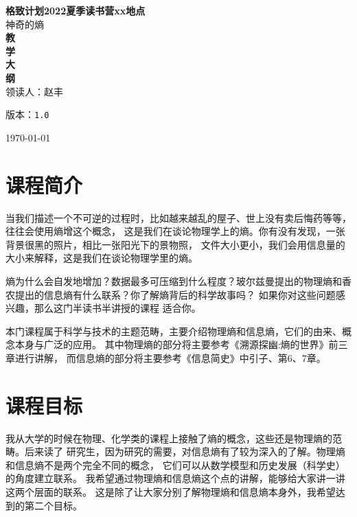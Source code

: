 \documentclass[12pt]{ctexart}
\def\version{1.0}
\newenvironment{smaller}{\zihao{5}}{\zihao{-4}}
\begin{document}
\begin{titlepage}
\begin{center}
    \vspace{-0.5in}
    \textmd{\textbf{\huge{格致计划2022夏季读书营xx地点}}}\\
    \normalsize\vspace{0.1in}\Large{神奇的熵}\\
    \vspace{0.8in}
     \textbf{\huge{教}}\\
    \vspace{0.8in}
     \textbf{\huge{学}}\\
    \vspace{0.8in}
     \textbf{\huge{大}}\\
    \vspace{0.8in}
    \textbf{\huge{纲}}\\
    \vspace{0.8in}
    领读人：赵丰
\vspace{0.2in}
\begin{smaller}

版本：\texttt{\version}

\today
\end{smaller}
\end{center}
\end{titlepage}
\thispagestyle{empty}
\pagebreak
\pagestyle{runningpage}

\section{课程简介}
当我们描述一个不可逆的过程时，比如越来越乱的屋子、世上没有卖后悔药等等，往往会使用熵增这个概念，
这是我们在谈论物理学上的熵。你有没有发现，一张背景很黑的照片，相比一张阳光下的景物照，
文件大小更小，我们会用信息量的大小来解释，这是我们在谈论物理学里的熵。

熵为什么会自发地增加？数据最多可压缩到什么程度？玻尔兹曼提出的物理熵和香农提出的信息熵有什么联系？你了解熵背后的科学故事吗？
如果你对这些问题感兴趣，那么这门半读书半讲授的课程
适合你。

本门课程属于科学与技术的主题范畴，主要介绍物理熵和信息熵，它们的由来、概念本身与广泛的应用。
其中物理熵的部分将主要参考《溯源探幽:熵的世界》前三章进行讲解，
而信息熵的部分将主要参考《信息简史》中引子、第6、7章。


\section{课程目标}
我从大学的时候在物理、化学类的课程上接触了熵的概念，这些还是物理熵的范畴。后来读了
研究生，因为研究的需要，对信息熵有了较为深入的了解。物理熵和信息熵不是两个完全不同的概念，
它们可以从数学模型和历史发展（科学史）的角度建立联系。
我希望通过物理熵和信息熵这个点的讲解，能够给大家讲一讲这两个层面的联系。
这是除了让大家分别了解物理熵和信息熵本身外，我希望达到的第二个目标。
\end{document}
